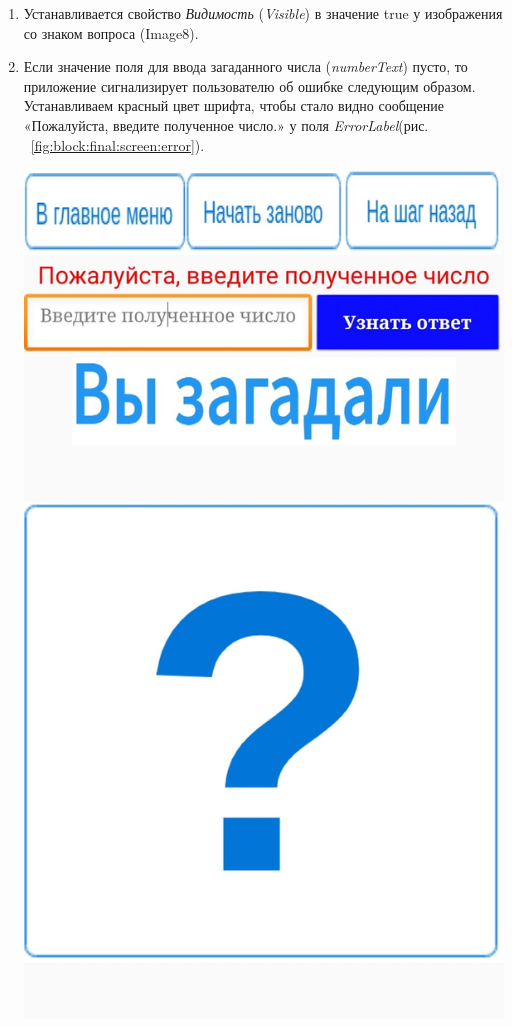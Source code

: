 \begin{enumerate}
  \item Устанавливается свойство \textit{Видимость} (\textit{Visible}) в значение true у изображения со знаком вопроса (Image8).
  \item Если значение поля для ввода загаданного числа (\textit{numberText}) пусто, то приложение сигнализирует пользователю об ошибке следующим образом. Устанавливаем красный цвет шрифта, чтобы стало видно сообщение «Пожалуйста, введите полученное число.» у поля \textit{ErrorLabel}(рис. ~\ref{fig:block:final:screen:error}).
  \begin{marginfigure}[-2em]
    \includegraphics{./graphics/programs/guess_numbers/finalScreen_Error2_TheGuessingNumbersGame_AppInventor.jpg}

\end{marginfigure}
\end{enumerate}

